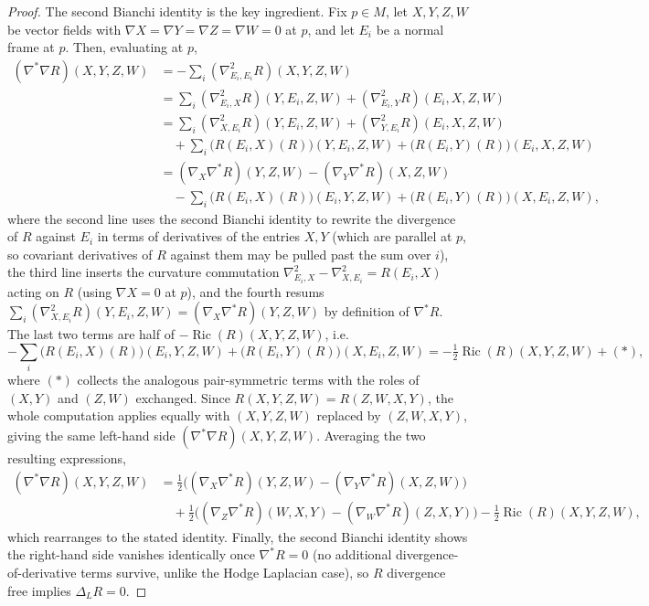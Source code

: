 \begin{proof}
  The second Bianchi identity is the key ingredient. Fix $p\in M$, let
  $X,Y,Z,W$ be vector fields with $\nabla X=\nabla Y=\nabla Z=\nabla W=0$ at
  $p$, and let $E_i$ be a normal frame at $p$. Then, evaluating at $p$,
  \begin{align*}
    (\nabla^*\nabla R)(X,Y,Z,W)
    &=-\sum_i(\nabla^2_{E_i,E_i}R)(X,Y,Z,W)\\
    &=\sum_i(\nabla^2_{E_i,X}R)(Y,E_i,Z,W)+(\nabla^2_{E_i,Y}R)(E_i,X,Z,W)\\
    &=\sum_i(\nabla^2_{X,E_i}R)(Y,E_i,Z,W)+(\nabla^2_{Y,E_i}R)(E_i,X,Z,W)\\
    &\quad+\sum_i\big(R(E_i,X)(R)\big)(Y,E_i,Z,W)+\big(R(E_i,Y)(R)\big)(E_i,X,Z,W)\\
    &=(\nabla_X\nabla^*R)(Y,Z,W)-(\nabla_Y\nabla^*R)(X,Z,W)\\
    &\quad-\sum_i\big(R(E_i,X)(R)\big)(E_i,Y,Z,W)+\big(R(E_i,Y)(R)\big)(X,E_i,Z,W),
  \end{align*}
  where the second line uses the second Bianchi identity to rewrite the
  divergence of $R$ against $E_i$ in terms of derivatives of the entries $X,Y$
  (which are parallel at $p$, so covariant derivatives of $R$ against them may
  be pulled past the sum over $i$), the third line inserts the curvature
  commutation $\nabla^2_{E_i,X}-\nabla^2_{X,E_i}=R(E_i,X)$ acting on $R$ (using
  $\nabla X=0$ at $p$), and the fourth resums $\sum_i(\nabla^2_{X,E_i}R)(Y,E_i,Z,W)
  =(\nabla_X\nabla^*R)(Y,Z,W)$ by definition of $\nabla^*R$. The last two terms
  are half of $-\operatorname{Ric}(R)(X,Y,Z,W)$, i.e.
  \[
    -\sum_i\big(R(E_i,X)(R)\big)(E_i,Y,Z,W)+\big(R(E_i,Y)(R)\big)(X,E_i,Z,W)
    =-\tfrac12\operatorname{Ric}(R)(X,Y,Z,W)+(\ast),
  \]
  where $(\ast)$ collects the analogous pair-symmetric terms with the roles of
  $(X,Y)$ and $(Z,W)$ exchanged. Since $R(X,Y,Z,W)=R(Z,W,X,Y)$, the whole
  computation applies equally with $(X,Y,Z,W)$ replaced by $(Z,W,X,Y)$, giving
  the same left-hand side $(\nabla^*\nabla R)(X,Y,Z,W)$. Averaging the two
  resulting expressions,
  \begin{align*}
    (\nabla^*\nabla R)(X,Y,Z,W)
    &=\tfrac12\big((\nabla_X\nabla^*R)(Y,Z,W)-(\nabla_Y\nabla^*R)(X,Z,W)\big)\\
    &\quad+\tfrac12\big((\nabla_Z\nabla^*R)(W,X,Y)-(\nabla_W\nabla^*R)(Z,X,Y)\big)
      -\tfrac12\operatorname{Ric}(R)(X,Y,Z,W),
  \end{align*}
  which rearranges to the stated identity. Finally, the second Bianchi
  identity shows the right-hand side vanishes identically once $\nabla^*R=0$
  (no additional divergence-of-derivative terms survive, unlike the Hodge
  Laplacian case), so $R$ divergence free implies $\Delta_LR=0$.
\end{proof}

